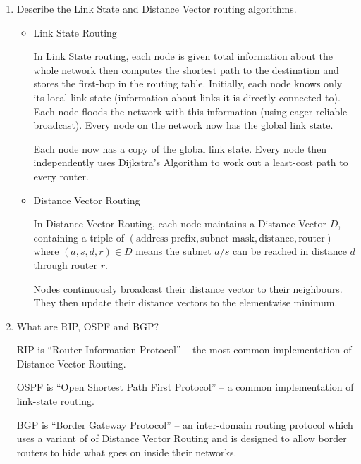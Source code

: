 \documentclass[10pt,\jkfside,a4paper]{article}
\begin{document}
\begin{enumerate}
\item Describe the Link State and Distance Vector routing algorithms.

\begin{itemize}

\item Link State Routing

In Link State routing, each node is given total information about the whole
network then computes the shortest path to the destination and stores the
first-hop in the routing table. Initially, each node knows only its local
link state (information about links it is directly connected to). Each
node floods the network with this information (using eager reliable
broadcast). Every node on the network now has the global link state.

Each node now has a copy of the global link state. Every node then
independently uses Dijkstra's Algorithm to work out a least-cost path to
every router.

\item Distance Vector Routing

In Distance Vector Routing, each node maintains a Distance Vector $D$,
containing a triple of $(\text{address prefix}, \text{subnet mask},
\text{distance}, \text{router})$ where $(a, s, d, r) \in D$ means the
subnet $a/s$ can be reached in distance $d$ through router $r$.

Nodes continuously broadcast their distance vector to their neighbours.
They then update their distance vectors to the elementwise minimum.

\end{itemize}

\item What are RIP, OSPF and BGP?

RIP is ``Router Information Protocol'' -- the most common implementation of
Distance Vector Routing.

OSPF is ``Open Shortest Path First Protocol'' -- a common implementation of
link-state routing.

BGP is ``Border Gateway Protocol'' -- an inter-domain routing protocol
which uses a variant of of Distance Vector Routing and is designed to
allow border routers to hide what goes on inside their networks.

\end{enumerate}
\end{document}
